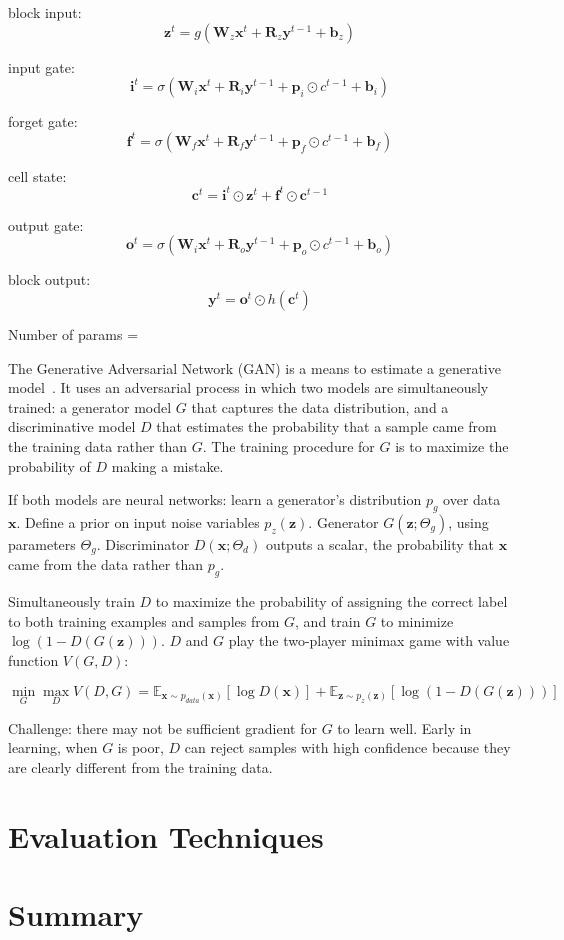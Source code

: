 block input:
\[ \bm{z}^{t} = g \left( \bm{W}_z \bm{x}^t + \bm{R}_z \bm{y}^{t - 1} + \bm{b}_z \right) \]

input gate:
\[ \bm{i}^{t} = \sigma \left( \bm{W}_i \bm{x}^t + \bm{R}_i \bm{y}^{t-1} + \bm{p}_i \odot c^{t-1} + \bm{b}_i \right) \]

forget gate:
\[ \bm{f}^{t} = \sigma \left( \bm{W}_f \bm{x}^t + \bm{R}_f \bm{y}^{t-1} + \bm{p}_f \odot c^{t-1} + \bm{b}_f \right) \]

cell state:
\[ \bm{c}^t = \bm{i}^t \odot \bm{z}^t + \bm{f}^t \odot \bm{c}^{t-1} \]

output gate:
\[ \bm{o}^{t} = \sigma \left( \bm{W}_i \bm{x}^t + \bm{R}_o \bm{y}^{t - 1} + \bm{p}_o \odot c^{t-1} + \bm{b}_o \right) \]

block output:
\[ \bm{y}^t = \bm{o}^t \odot h(\bm{c}^t) \]

Number of params = \todo[inline]{\ldots}



The Generative Adversarial Network (GAN) is a means to estimate a generative model~\cite{Goodfellow2014}. It uses an adversarial process in which two models are simultaneously trained: a generator model $G$ that captures the data distribution, and a discriminative model $D$ that estimates the probability that a sample came from the training data rather than $G$. The training procedure for $G$ is to maximize the probability of $D$ making a mistake.

If both models are neural networks: learn a generator's distribution $p_g$ over data $\bm{x}$. Define a prior on input noise variables $p_z(\bm{z})$. Generator $G(\bm{z}; \Theta_g)$, using parameters $\Theta_g$. Discriminator $D(\bm{x}; \Theta_d)$ outputs a scalar, the probability that $\bm{x}$ came from the data rather than $p_g$. 

Simultaneously train $D$ to maximize the probability of assigning the correct label to both training examples and samples from $G$, and train $G$ to minimize $\log (1 - D(G(\bm{z})))$. $D$ and $G$ play the two-player minimax game with value function $V(G, D)$:

\[ \min_G \max_D V(D, G) = \mathbb{E}_{\bm{x} \sim  p_{data}(\bm{x})} [ \log D(\bm{x}) ] + \mathbb{E}_{\bm{z} \sim p_z(\bm{z})} [ \log (1 - D(G(\bm{z}))) ] \]

Challenge: there may not be sufficient gradient for $G$ to learn well. Early in learning, when $G$ is poor, $D$ can reject samples with high confidence because they are clearly different from the training data.

\section{Evaluation Techniques}

\section{Summary}
